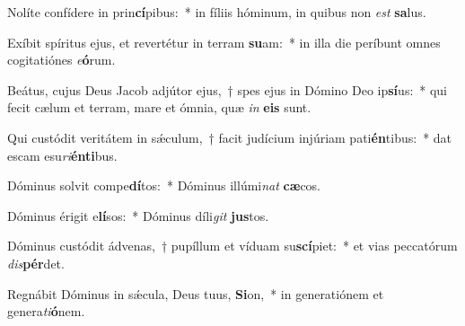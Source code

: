\item Nolíte confídere in prin\textbf{cí}pibus:~* in fíliis hóminum, in quibus non \textit{est} \textbf{sa}lus.
\item Exíbit spíritus ejus, et revertétur in terram \textbf{su}am:~* in illa die períbunt omnes cogitatiónes \textit{e}\textbf{ó}rum.
\item Beátus, cujus Deus Jacob adjútor ejus,~† spes ejus in Dómino Deo ip\textbf{sí}us:~* qui fecit cælum et terram, mare et ómnia, quæ \textit{in} \textbf{e}\textbf{is} sunt.
\item Qui custódit veritátem in sǽculum,~† facit judícium injúriam pati\textbf{én}tibus:~* dat escam esu\textit{ri}\textbf{én}\textbf{ti}bus.
\item Dóminus solvit compe\textbf{dí}tos:~* Dóminus illúmi\textit{nat} \textbf{cæ}cos.
\item Dóminus érigit e\textbf{lí}sos:~* Dóminus díli\textit{git} \textbf{jus}tos.
\item Dóminus custódit ádvenas,~† pupíllum et víduam su\textbf{scí}piet:~* et vias peccatórum \textit{dis}\textbf{pér}det.
\item Regnábit Dóminus in sǽcula, Deus tuus, \textbf{Si}on,~* in generatiónem et genera\textit{ti}\textbf{ó}nem.
